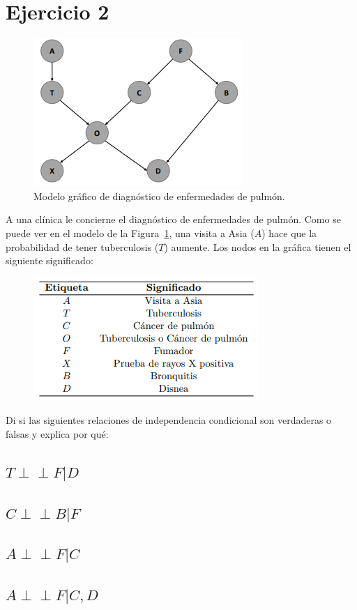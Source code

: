 \documentclass[12pt]{article}
\begin{document}
	\section{Ejercicio 2}	 
	  \begin{figure}[h!]
	  	\centering
	  	\includegraphics[width=.4\linewidth]{excercise2f}
	  	\caption{Modelo gráfico de diagnóstico de enfermedades de pulmón.}
	  	\label{fig1}
	  \end{figure}
	A una clínica le concierne el diagnóstico de enfermedades de pulmón. Como se puede ver en el modelo de la Figura~\ref{fig1}, una visita a Asia ($A$) hace que la probabilidad de tener tuberculosis ($T$) aumente. Los nodos en la gráfica tienen el siguiente significado:	 
	\begin{figure}[h!]
		\centering
		\includegraphics[width=.4\linewidth]{excercise2t}
		\label{table1}
	\end{figure}
Di si las siguientes relaciones de independencia condicional son verdaderas o falsas y explica por qué:
\subsection{$T  \perp\!\!\!\perp F | D$}
\subsection{$C  \perp\!\!\!\perp B | F$}
\subsection{$A  \perp\!\!\!\perp F | C$}
\subsection{$A  \perp\!\!\!\perp F | C,D$}
\end{document}

